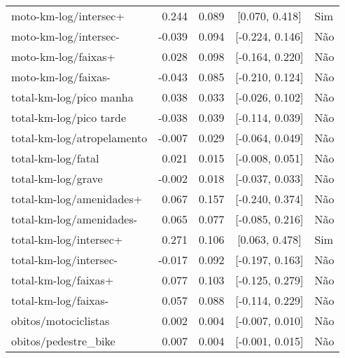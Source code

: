 \begin{longtable}{lrrcl}
moto-km-log/intersec+ & 0.244 & 0.089 & {}[0.070, 0.418] & Sim\\
moto-km-log/intersec- & -0.039 & 0.094 & {}[-0.224, 0.146] & Não\\
moto-km-log/faixas+ & 0.028 & 0.098 & {}[-0.164, 0.220] & Não\\
moto-km-log/faixas- & -0.043 & 0.085 & {}[-0.210, 0.124] & Não\\
total-km-log/pico manha & 0.038 & 0.033 & {}[-0.026, 0.102] & Não\\
total-km-log/pico tarde & -0.038 & 0.039 & {}[-0.114, 0.039] & Não\\
total-km-log/atropelamento & -0.007 & 0.029 & {}[-0.064, 0.049] & Não\\
total-km-log/fatal & 0.021 & 0.015 & {}[-0.008, 0.051] & Não\\
total-km-log/grave & -0.002 & 0.018 & {}[-0.037, 0.033] & Não\\
total-km-log/amenidades+ & 0.067 & 0.157 & {}[-0.240, 0.374] & Não\\
total-km-log/amenidades- & 0.065 & 0.077 & {}[-0.085, 0.216] & Não\\
total-km-log/intersec+ & 0.271 & 0.106 & {}[0.063, 0.478] & Sim\\
total-km-log/intersec- & -0.017 & 0.092 & {}[-0.197, 0.163] & Não\\
total-km-log/faixas+ & 0.077 & 0.103 & {}[-0.125, 0.279] & Não\\
total-km-log/faixas- & 0.057 & 0.088 & {}[-0.114, 0.229] & Não\\
obitos/motociclistas & 0.002 & 0.004 & {}[-0.007, 0.010] & Não\\
obitos/pedestre\_bike & 0.007 & 0.004 & {}[-0.001, 0.015] & Não\\*
\end{longtable}
